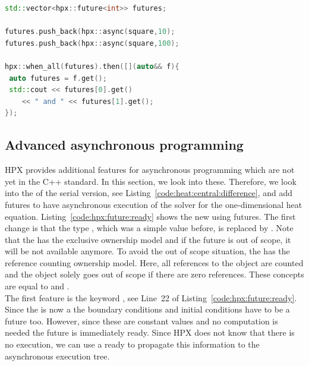 \documentclass[11pt,fleqn]{book} %
\begin{document}
\begin{lstlisting}[language=c++,caption={Advanced synchronization of futures using HPX.\label{code:hpx:future:sync}},float,floatplacement=tb]
std::vector<hpx::future<int>> futures;

futures.push_back(hpx::async(square,10);
futures.push_back(hpx::async(square,100);

hpx::when_all(futures).then([](auto&& f){
 auto futures = f.get();
 std::cout << futures[0].get() 
 	<< " and " << futures[1].get();
});
\end{lstlisting}

\subsection{Advanced asynchronous programming}
HPX provides additional features for asynchronous programming which are not yet in the C++ standard. In this section, we look into these. Therefore, we look into the  of the serial version, see Listing~\ref{code:heat:central:difference}, and add futures to have asynchronous execution of the solver for the one-dimensional heat equation. Listing~\ref{code:hpx:future:ready} shows the new  using futures. The first change is that the type , which was a simple  value before, is replaced by . Note that the  has the exclusive ownership model and if the future is out of scope, it will be not available anymore. To avoid the out of scope situation, the  has the reference counting ownership model. Here, all references to the object are counted and the object solely goes out of scope if there are zero references. These concepts are equal to  and .\\
 
The first feature is the keyword , see Line~22 of Listing~\ref{code:hpx:future:ready}. Since the  is now a  the boundary conditions and initial conditions have to be a future too. However, since these are constant values and no computation is needed the future is immediately ready. Since HPX does not know that there is no execution, we can use a  ready to propagate this information to the asynchronous execution tree.\\
\end{document}
